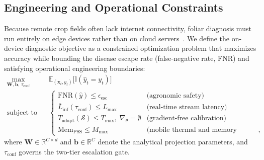 \documentclass[preprint,12pt]{elsarticle}
\begin{document}
\subsection{Engineering and Operational Constraints}
\label{sec:engineering_constraints}
Because remote crop fields often lack internet connectivity, foliar diagnosis must run entirely on edge devices rather than on cloud servers~\cite{shoaib2023advanced}. We define the on-device diagnostic objective as a constrained optimization problem that maximizes accuracy while bounding the disease escape rate (false-negative rate, FNR) and satisfying operational engineering boundaries:
\begin{equation}
\begin{aligned}
    \max_{\mathbf{W}, \mathbf{b}, \, \tau_{\text{conf}}} \quad & \mathbb{E}_{(\mathbf{x}_t, y_t)}\big[\mathbb{I}(\hat{y}_t = y_t)\big] \\
    \text{subject to} \quad & \begin{cases}
        \text{FNR}(\hat{y}) \le \epsilon_{\text{esc}} & \text{(agronomic safety)} \\
        \overline{L}_{\text{inf}}(\tau_{\text{conf}}) \le L_{\max} & \text{(real-time stream latency)} \\
        T_{\text{adapt}}(\mathcal{S}) \le T_{\max}, \; \nabla_\theta = \emptyset & \text{(gradient-free calibration)} \\
        \text{Mem}_{\text{PSS}} \le M_{\max} & \text{(mobile thermal and memory budget)},
    \end{cases}
\end{aligned}
\label{eq:constrained_objective}
\end{equation}
where $\mathbf{W} \in \mathbb{R}^{C \times d}$ and $\mathbf{b} \in \mathbb{R}^C$ denote the analytical projection parameters, and $\tau_{\text{conf}}$ governs the two-tier escalation gate.
\end{document}
